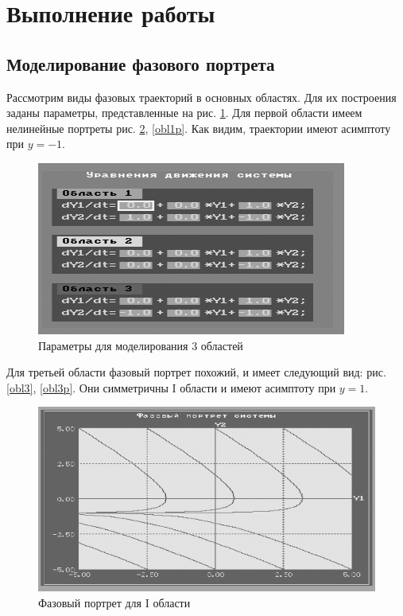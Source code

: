 	

	\section{Выполнение работы}
	\subsection{Моделирование фазового портрета}
	
	Рассмотрим виды фазовых траекторий в основных областях. Для их построения заданы параметры, представленные на рис. \ref{params_m}. Для первой области имеем нелинейные портреты рис. \ref{obl1}, \ref{obl1p}. Как видим, траектории имеют асимптоту при $y=-1$.
	
	\begin{figure}[h]
		\centering\includegraphics[width=.4\textwidth]{png/10.png}
		\caption{Параметры для моделирования 3 областей}
		\label{params_m}
	\end{figure}
	
	Для третьей области фазовый портрет похожий, и имеет следующий вид: рис. \ref{obl3}, \ref{obl3p}. Они симметричны I области и имеют асимптоту при $y=1$.
	
	\begin{figure}[h]
		\centering\includegraphics[width=.55\textwidth]{png/1.png}
		\caption{Фазовый портрет для I области}
		\label{obl1}
	\end{figure}

